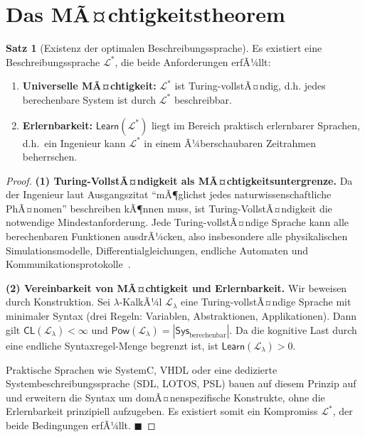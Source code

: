 ﻿\documentclass[a4paper,12pt]{report}
\theoremstyle{definition}
\newtheorem{satz}{Satz}[section]
\begin{document}
\section{Das MÃ¤chtigkeitstheorem}
\label{sec:maechtigkeitstheorem}

\begin{satz}[Existenz der optimalen Beschreibungssprache]
\label{satz:optsprache}
Es existiert eine Beschreibungssprache $\mathcal{L}^*$, die beide Anforderungen erfÃ¼llt:
\begin{enumerate}
  \item \textbf{Universelle MÃ¤chtigkeit:} $\mathcal{L}^*$ ist Turing-vollstÃ¤ndig, d.h.
        jedes berechenbare System ist durch $\mathcal{L}^*$ beschreibbar.
  \item \textbf{Erlernbarkeit:} $\mathsf{Learn}(\mathcal{L}^*)$ liegt im Bereich
        praktisch erlernbarer Sprachen, d.h.\ ein Ingenieur kann $\mathcal{L}^*$ in
        einem Ã¼berschaubaren Zeitrahmen beherrschen.
\end{enumerate}
\end{satz}

\begin{proof}
\textbf{(1) Turing-VollstÃ¤ndigkeit als MÃ¤chtigkeitsuntergrenze.}
Da der Ingenieur laut Ausgangszitat \enquote{mÃ¶glichst jedes naturwissenschaftliche PhÃ¤nomen}
beschreiben kÃ¶nnen muss, ist Turing-VollstÃ¤ndigkeit die notwendige Mindestanforderung.
Jede Turing-vollstÃ¤ndige Sprache kann alle berechenbaren Funktionen ausdrÃ¼cken, also
insbesondere alle physikalischen Simulationsmodelle, Differentialgleichungen,
endliche Automaten und Kommunikationsprotokolle~\cite{turing1936}.

\textbf{(2) Vereinbarkeit von MÃ¤chtigkeit und Erlernbarkeit.}
Wir beweisen durch Konstruktion.
Sei $\lambda$-KalkÃ¼l $\mathcal{L}_\lambda$ eine Turing-vollstÃ¤ndige Sprache mit
minimaler Syntax (drei Regeln: Variablen, Abstraktionen, Applikationen).
Dann gilt $\mathsf{CL}(\mathcal{L}_\lambda) < \infty$ und
$\mathsf{Pow}(\mathcal{L}_\lambda) = |\mathsf{Sys}_{\text{berechenbar}}|$.
Da die kognitive Last durch eine endliche Syntaxregel-Menge begrenzt ist, ist
$\mathsf{Learn}(\mathcal{L}_\lambda) > 0$.

Praktische Sprachen wie SystemC, VHDL oder eine dedizierte
Systembeschreibungssprache (SDL, LOTOS, PSL) bauen auf diesem Prinzip auf und
erweitern die Syntax um domÃ¤nenspezifische Konstrukte, ohne die Erlernbarkeit
prinzipiell aufzugeben. Es existiert somit ein Kompromiss $\mathcal{L}^*$, der beide
Bedingungen erfÃ¼llt. $\blacksquare$
\end{proof}
\end{document}
